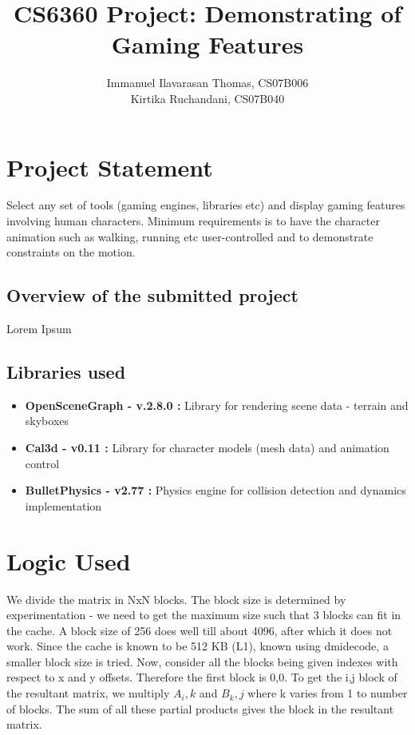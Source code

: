 \documentclass[a4paper]{article}
\title{\color{db} \textbf{CS6360 Project: Demonstrating of Gaming Features}}
\author{Immanuel Ilavarasan Thomas, CS07B006 \\  Kirtika Ruchandani, CS07B040}
\begin{document}
\sffamily
\maketitle



\section*{\color{db}Project Statement}
Select any set of tools (gaming engines, libraries etc) and display gaming
features involving human characters. Minimum requirements is to have the
character animation such as walking, running etc user-controlled and to
demonstrate constraints on the motion. 

\subsection*{\color{db}Overview of the submitted project}
Lorem Ipsum

\subsection*{\color{db}Libraries used}
\begin{itemize}
\item \textbf{OpenSceneGraph - v.2.8.0 : } Library for rendering scene data
- terrain and skyboxes 
\item \textbf{Cal3d - v0.11 : } Library for character models (mesh data) and animation control
\item \textbf{BulletPhysics - v2.77 : } Physics engine for collision detection
and dynamics implementation
\end{itemize}


\section{\color{db}Logic Used}
We divide the matrix in NxN blocks. The block size is determined by experimentation - we need to get the maximum size such that 3 blocks can fit in the cache.
A block size of 256 does well till about 4096, after which it does not work. Since the cache is known to be 512 KB (L1), known using dmidecode, a smaller block size is tried.
Now, consider all the blocks being given indexes with respect to x and y offsets. Therefore the first block is 0,0. To get the i,j block of the resultant matrix, we multiply
$A_i,k$ and $B_k,j$ where k varies from 1 to number of blocks. The sum of all these partial products gives the block in the resultant matrix.
\end{document}

